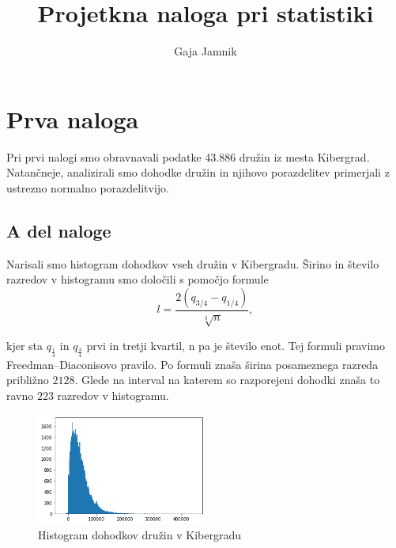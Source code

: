 \documentclass{article}
\title{Projetkna naloga pri statistiki}
\author{Gaja Jamnik}
\date{}
\begin{document}
    \maketitle


\section{Prva naloga}

Pri prvi nalogi smo obravnavali podatke 43.886 družin iz mesta Kibergrad. Natančneje, analizirali smo dohodke
družin in njihovo porazdelitev primerjali z ustrezno normalno porazdelitvijo.

\subsection{A del naloge}

Narisali smo histogram dohodkov vseh družin v Kibergradu. 
Širino in število razredov v histogramu smo določili s pomočjo formule
\begin{equation}
    l = \frac{2(q_{3/4} - q_{1/4})}{\sqrt[3]{n}},
\end{equation}

kjer sta $q_{\frac{1}{4}}$ in $q_{\frac{3}{4}}$ prvi in tretji kvartil, n pa je število enot.
Tej formuli pravimo Freedman–Diaconisovo pravilo. Po formuli znaša širina posameznega razreda približno $2128$.
Glede na interval na katerem so razporejeni dohodki znaša to ravno $223$ razredov v histogramu.

\begin{figure}[H]
    \begin{center}
        \includegraphics*[width=0.5\textwidth]{figure1A.png}
        \caption{Histogram dohodkov družin v Kibergradu}
        \label{hist_dohodki}
    \end{center}
\end{figure}

\end{document}
